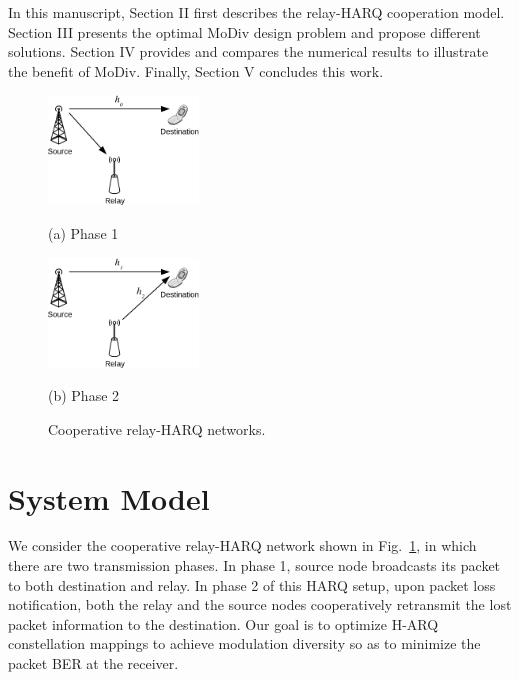 \documentclass[journal,draftcls,onecolumn,12pt,twoside]{IEEEtran}
\begin{document}
In this manuscript, Section II first describes the relay-HARQ cooperation model.
Section III presents the optimal MoDiv design problem and propose different
solutions. Section IV provides and compares the numerical results to illustrate
the benefit of MoDiv. Finally, Section V concludes this work. 

\begin{figure}[!t]
    \begin{minipage}[b]{0.48\linewidth}
      \centering
      \centerline{\includegraphics[width=4.0cm]{./figs/relayHARQ1.eps}}
      \centerline{(a) Phase 1}\medskip
    \end{minipage}
    \hfill
    \begin{minipage}[b]{.48\linewidth}
      \centering
      \centerline{\includegraphics[width=4.0cm]{./figs/relayHARQ2.eps}}
      \centerline{(b) Phase 2}\medskip
    \end{minipage}
    \caption{Cooperative relay-HARQ networks.}
    \label{fig:system_model}
\end{figure}



\section{System Model}
\label{sec:model}
We consider the cooperative relay-HARQ network shown in
Fig.~\ref{fig:system_model}, in which there are two transmission phases.
In phase 1, source node broadcasts its packet to both destination and relay. In
phase 2 of this HARQ setup, upon packet loss notification, both the relay and
the source nodes cooperatively retransmit the lost packet information to the
destination. Our goal is to optimize  H-ARQ constellation mappings to achieve
modulation diversity so as to minimize the packet BER at the receiver.
\end{document}
